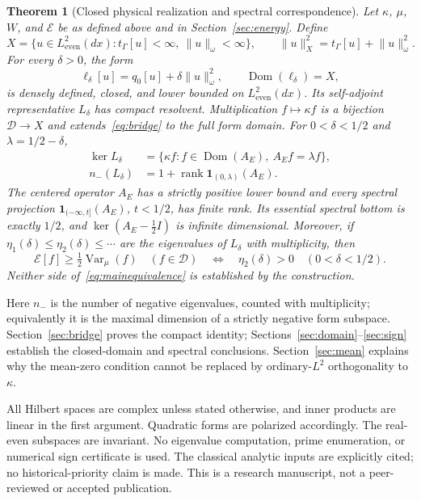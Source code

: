 \documentclass[11pt,a4paper]{article}
\numberwithin{equation}{section}
\newtheorem{theorem}{Theorem}[section]
\theoremstyle{remark}
\newcommand{\E}{\mathcal E}
\newcommand{\D}{\mathcal D}
\newcommand{\Le}{L^2_{\mathrm{even}}(dx)}
\newcommand{\tg}{t_{\Gamma}}
\newcommand{\dom}{\operatorname{Dom}}
\newcommand{\Var}{\operatorname{Var}}
\newcommand{\rank}{\operatorname{rank}}
\newcommand{\norm}[1]{\lVert #1\rVert}
\newcommand{\one}{\mathbf 1}
\begin{document}
\begin{theorem}[Closed physical realization and spectral correspondence]\label{thm:main}
Let $\kappa$, $\mu$, $W$, and $\E$ be as defined above and in Section~\ref{sec:energy}. Define
\begin{equation}\label{eq:X}
 X=\{u\in\Le:\tg[u]<\infty,\ \norm{u}_\omega<\infty\},\qquad
 \norm{u}_X^2=\tg[u]+\norm{u}_\omega^2.
\end{equation}
For every $\delta>0$, the form
\begin{equation}\label{eq:ell}
 \ell_\delta[u]=q_0[u]+\delta\norm{u}_\omega^2,
 \qquad\dom(\ell_\delta)=X,
\end{equation}
is densely defined, closed, and lower bounded on $\Le$. Its self-adjoint representative $L_\delta$ has compact resolvent. Multiplication $f\mapsto\kappa f$ is a bijection $\D\to X$ and extends~\eqref{eq:bridge} to the full form domain. For $0<\delta<1/2$ and $\lambda=1/2-\delta$,
\begin{align}
 \ker L_\delta
 &=\{\kappa f:f\in\dom(A_E),\ A_Ef=\lambda f\},\label{eq:mainkernel}\\
 n_-(L_\delta)
 &=1+\rank\one_{(0,\lambda)}(A_E).\label{eq:mainindex}
\end{align}
The centered operator $A_E$ has a strictly positive lower bound and every spectral projection $\one_{(-\infty,t]}(A_E)$, $t<1/2$, has finite rank. Its essential spectral bottom is exactly $1/2$, and $\ker(A_E-\tfrac12 I)$ is infinite dimensional. Moreover, if $\eta_1(\delta)\le\eta_2(\delta)\le\cdots$ are the eigenvalues of $L_\delta$ with multiplicity, then
\begin{equation}\label{eq:mainequivalence}
 \E[f]\ge\tfrac12\Var_\mu(f)\quad(f\in\D)
 \quad\Longleftrightarrow\quad
 \eta_2(\delta)>0\quad(0<\delta<1/2).
\end{equation}
Neither side of~\eqref{eq:mainequivalence} is established by the construction.
\end{theorem}

Here $n_-$ is the number of negative eigenvalues, counted with multiplicity; equivalently it is the maximal dimension of a strictly negative form subspace. Section~\ref{sec:bridge} proves the compact identity; Sections~\ref{sec:domain}--\ref{sec:sign} establish the closed-domain and spectral conclusions. Section~\ref{sec:mean} explains why the mean-zero condition cannot be replaced by ordinary-$L^2$ orthogonality to $\kappa$.

All Hilbert spaces are complex unless stated otherwise, and inner products are linear in the first argument. Quadratic forms are polarized accordingly. The real-even subspaces are invariant. No eigenvalue computation, prime enumeration, or numerical sign certificate is used. The classical analytic inputs are explicitly cited; no historical-priority claim is made. This is a research manuscript, not a peer-reviewed or accepted publication.
\end{document}
